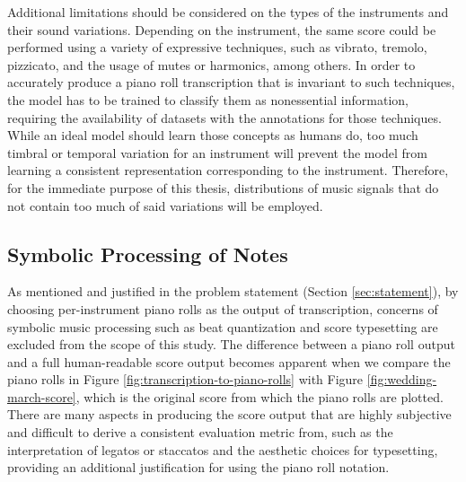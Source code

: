 Additional limitations should be considered on the types of the instruments and their sound variations.
Depending on the instrument, the same score could be performed using a variety of expressive techniques, such as vibrato, tremolo, pizzicato, and the usage of mutes or harmonics, among others.
In order to accurately produce a piano roll transcription that is invariant to such techniques, the model has to be trained to classify them as nonessential information, requiring the availability of datasets with the annotations for those techniques.
While an ideal model should learn those concepts as humans do, too much timbral or temporal variation for an instrument will prevent the model from learning a consistent representation corresponding to the instrument.
Therefore, for the immediate purpose of this thesis, distributions of music signals that do not contain too much of said variations will be employed.


\subsection{Symbolic Processing of Notes}

As mentioned and justified in the problem statement (Section \ref{sec:statement}), by choosing per-instrument piano rolls as the output of transcription, concerns of symbolic music processing such as beat quantization and score typesetting are excluded from the scope of this study.
The difference between a piano roll output and a full human-readable score output becomes apparent when we compare the piano rolls in Figure \ref{fig:transcription-to-piano-rolls} with Figure \ref{fig:wedding-march-score}, which is the original score from which the piano rolls are plotted.
There are many aspects in producing the score output that are highly subjective and difficult to derive a consistent evaluation metric from, such as the interpretation of legatos or staccatos and the aesthetic choices for typesetting, providing an additional justification for using the piano roll notation.


